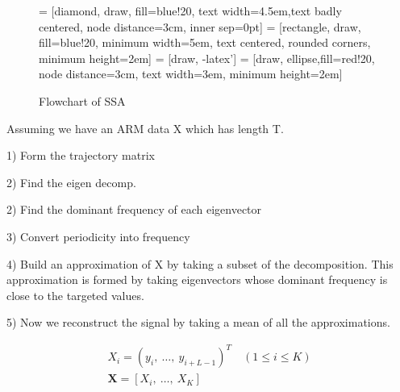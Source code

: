 \documentclass[letterpaper, 10 pt, conference]{ieeeconf}  %
\begin{document}
\begin{figure}[ht]
    \centering
     = [diamond, draw, fill=blue!20, text width=4.5em,text badly centered, node distance=3cm, inner sep=0pt]
     = [rectangle, draw, fill=blue!20, minimum width=5em, text centered, rounded corners, minimum height=2em]
     = [draw, -latex']
     = [draw, ellipse,fill=red!20, node distance=3cm, text width=3em, minimum height=2em]
    \caption{Flowchart of SSA}
    \label{fig:pcs}
\end{figure}

Assuming we have an ARM data X which has length T.

1) Form the trajectory matrix

2) Find the eigen decomp. 

2) Find the dominant frequency of each eigenvector

3) Convert periodicity into frequency

4) Build an approximation of X by taking a subset of the decomposition. This approximation is formed by taking eigenvectors whose dominant frequency is close to the targeted values.

5) Now we reconstruct the signal by taking a mean of all the approximations.


\begin{align*}
X_i = (y_i,\ \ldots,\ y_{i+L-1})^T \quad (1 \leq i \leq K) \\
\mathbf{X} = [X_i,\ \ldots,\ X_K] 
\end{align*}
\end{document}
